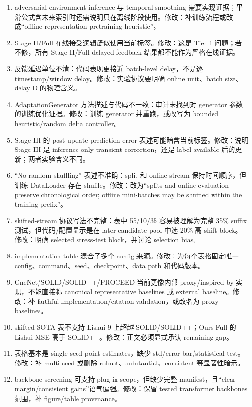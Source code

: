 ﻿\documentclass[journal]{IEEEtran}
\newcommand{\auditid}[1]{\textcolor{auditred}{\textbf{[#1]}}}
\begin{document}
\begin{enumerate}
\item[\auditid{P12}] adversarial environment inference 与 temporal smoothing 需要实现证据；平滑公式含未来索引时还需说明只在离线阶段使用。修改：补训练流程或改成“offline representation pretraining heuristic”。
\item[\auditid{P13}] Stage II/Full 在线接受逻辑疑似使用当前标签。修改：这是 Tier 1 问题；若不修，所有 Stage II/Full delayed-feedback 结果都不能作为严格在线证据。
\item[\auditid{P14}] 反馈延迟单位不清：代码表现更接近 batch-level delay，不是逐 timestamp/window delay。修改：实验协议要明确 online unit、batch size、delay D 的物理含义。
\item[\auditid{P15}] AdaptationGenerator 方法描述与代码不一致：审计未找到对 generator 参数的训练优化证据。修改：训练 generator 并重跑，或改写为 bounded heuristic/random delta controller。
\item[\auditid{P16}] Stage III 的 post-update prediction error 表述可能暗含当前标签。修改：说明 Stage III 是 inference-only transient correction，还是 label-available 后的更新；两者实验含义不同。
\item[\auditid{P17}] “No random shuffling” 表述不准确：split 和 online stream 保持时间顺序，但训练 DataLoader 存在 shuffle。修改：改为“splits and online evaluation preserve chronological order; offline mini-batches may be shuffled within the training prefix”。
\item[\auditid{P18}] shifted-stream 协议写法不完整：表中 55/10/35 容易被理解为完整 35\% suffix 测试，但代码/配置显示是在 later candidate pool 中选 20\% 高 shift block。修改：明确 selected stress-test block，并讨论 selection bias。
\item[\auditid{P19}] implementation table 混合了多个 config 来源。修改：为每个表格固定唯一 config、command、seed、checkpoint、data path 和代码版本。
\item[\auditid{P20}] OneNet/SOLID/SOLID++/PROCEED 当前更像内部 proxy/inspired-by 实现，不能直接称 canonical representative baselines 或 external baseline。修改：补 faithful implementation/citation validation，或改名为 proxy baselines。
\item[\auditid{P21}] shifted SOTA 表不支持 Lishui-9 上超越 SOLID/SOLID++；Ours-Full 的 Lishui MSE 高于 SOLID++。修改：正文必须显式承认 remaining gap。
\item[\auditid{P22}] 表格基本是 single-seed point estimates，缺少 std/error bar/statistical test。修改：补 multi-seed 或删除 robust、substantial、consistent 等显著性暗示。
\item[\auditid{P23}] backbone screening 可支持 plug-in scope，但缺少完整 manifest，且“clear margin/consistent gains”语气偏强。修改：保留 tested transformer backbones 范围，补 figure/table provenance。

\end{enumerate}
\end{document}

